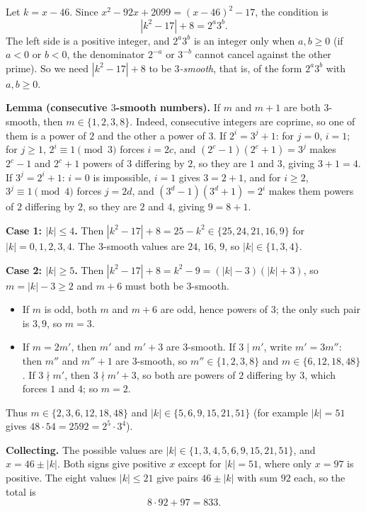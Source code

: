 Let $k=x-46$. Since $x^2-92x+2099=(x-46)^2-17$, the condition is
\[\left|k^2-17\right|+8=2^a3^b .\]
The left side is a positive integer, and $2^a3^b$ is an integer only when $a,b\ge0$ (if $a<0$ or $b<0$, the denominator $2^{-a}$ or $3^{-b}$ cannot cancel against the other prime). So we need $\left|k^2-17\right|+8$ to be \emph{$3$-smooth}, that is, of the form $2^a3^b$ with $a,b\ge0$.

\textbf{Lemma (consecutive $3$-smooth numbers).} If $m$ and $m+1$ are both $3$-smooth, then $m\in\{1,2,3,8\}$. Indeed, consecutive integers are coprime, so one of them is a power of $2$ and the other a power of $3$. If $2^i=3^j+1$: for $j=0$, $i=1$; for $j\ge1$, $2^i\equiv1\pmod3$ forces $i=2c$, and $(2^c-1)(2^c+1)=3^j$ makes $2^c-1$ and $2^c+1$ powers of $3$ differing by $2$, so they are $1$ and $3$, giving $3+1=4$. If $3^j=2^i+1$: $i=0$ is impossible, $i=1$ gives $3=2+1$, and for $i\ge2$, $3^j\equiv1\pmod4$ forces $j=2d$, and $(3^d-1)(3^d+1)=2^i$ makes them powers of $2$ differing by $2$, so they are $2$ and $4$, giving $9=8+1$.

\textbf{Case 1: $|k|\le4$.} Then $\left|k^2-17\right|+8=25-k^2\in\{25,24,21,16,9\}$ for $|k|=0,1,2,3,4$. The $3$-smooth values are $24$, $16$, $9$, so $|k|\in\{1,3,4\}$.

\textbf{Case 2: $|k|\ge5$.} Then $\left|k^2-17\right|+8=k^2-9=(|k|-3)(|k|+3)$, so $m=|k|-3\ge2$ and $m+6$ must both be $3$-smooth.
\begin{itemize}
\item If $m$ is odd, both $m$ and $m+6$ are odd, hence powers of $3$; the only such pair is $3,9$, so $m=3$.
\item If $m=2m'$, then $m'$ and $m'+3$ are $3$-smooth. If $3\mid m'$, write $m'=3m''$: then $m''$ and $m''+1$ are $3$-smooth, so $m''\in\{1,2,3,8\}$ and $m\in\{6,12,18,48\}$. If $3\nmid m'$, then $3\nmid m'+3$, so both are powers of $2$ differing by $3$, which forces $1$ and $4$; so $m=2$.
\end{itemize}
Thus $m\in\{2,3,6,12,18,48\}$ and $|k|\in\{5,6,9,15,21,51\}$ (for example $|k|=51$ gives $48\cdot54=2592=2^5\cdot3^4$).

\textbf{Collecting.} The possible values are $|k|\in\{1,3,4,5,6,9,15,21,51\}$, and $x=46\pm|k|$. Both signs give positive $x$ except for $|k|=51$, where only $x=97$ is positive. The eight values $|k|\le21$ give pairs $46\pm|k|$ with sum $92$ each, so the total is
\[8\cdot92+97=\boxed{833}.\]
